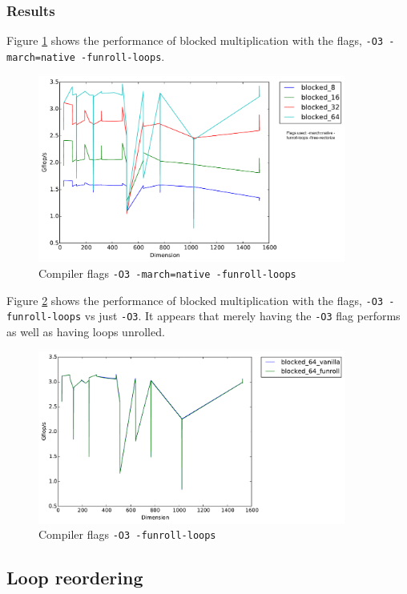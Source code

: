 \documentclass[11pt]{article}
\theoremstyle{plain}
\theoremstyle{definition}
\begin{document}
\subsubsection{Results}
Figure \ref{all_optimized_blocked} shows the performance of blocked multiplication with the flags, \texttt{-O3 -march=native -funroll-loops}.
\begin{figure}[H]
    \includegraphics[width=0.9\textwidth]{timing_flags_blocked.pdf}
    \caption{Compiler flags \texttt{-O3 -march=native -funroll-loops}}
    \label{all_optimized_blocked}
\end{figure} 

Figure \ref{funroll_vanilla} shows the performance of blocked multiplication with the flags, \texttt{-O3 -funroll-loops} vs just \texttt{-O3}. It appears that merely having the \texttt{-O3} flag performs as well as having loops unrolled. 
\begin{figure}[H]
    \includegraphics[width=0.9\textwidth]{timing_funroll_vanilla.pdf}
    \caption{Compiler flags \texttt{-O3 -funroll-loops}}
    \label{funroll_vanilla}
\end{figure} 


\subsection{Loop reordering}
\end{document}
